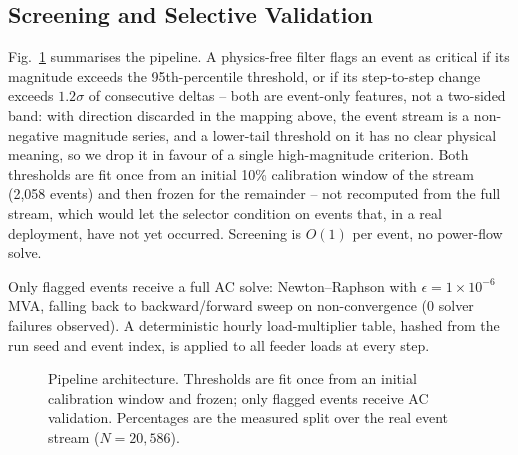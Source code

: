 \documentclass[11pt,conference]{IEEEtran}
\begin{document}
\subsection{Screening and Selective Validation}
\label{sec:pipeline}
Fig.~\ref{fig:architecture} summarises the pipeline. A physics-free filter flags an event as
critical if its magnitude exceeds the 95th-percentile threshold, or if its step-to-step change
exceeds $1.2\sigma$ of consecutive deltas -- both are event-only features, not a two-sided band:
with direction discarded in the mapping above, the event stream is a non-negative magnitude series,
and a lower-tail threshold on it has no clear physical meaning, so we drop it in favour of a single
high-magnitude criterion. Both thresholds are fit once from an initial 10\% calibration window of
the stream (2,058 events) and then frozen for the remainder -- not recomputed from the full stream,
which would let the selector condition on events that, in a real deployment, have not yet occurred.
Screening is $O(1)$ per event, no power-flow solve.

Only flagged events receive a full AC solve: Newton--Raphson with $\epsilon=1\times10^{-6}$\,MVA,
falling back to backward/forward sweep on non-convergence (0 solver failures observed). A
deterministic hourly load-multiplier table, hashed from the run seed and event index, is applied to
all feeder loads at every step.

\begin{figure}[htbp]
    \centering
    \caption{Pipeline architecture. Thresholds are fit once from an initial calibration window and frozen; only flagged events receive AC validation. Percentages are the measured split over the real event stream ($N=20{,}586$).}
    \label{fig:architecture}
\end{figure}
\end{document}
